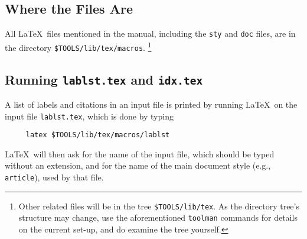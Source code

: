 %

\subsection{Where the Files Are}

%

All \LaTeX\ files mentioned in the manual, including the {\tt sty} and
{\tt doc} files, are in the directory \mbox{\tt \$TOOLS/lib/tex/macros}.%
\footnote{
Other related files will be in the tree \mbox{\tt \$TOOLS/lib/tex}.
As the directory tree's structure may change, use the aforementioned
{\tt toolman} commands for details on the current set-up, and do
examine the tree yourself.
}

\subsection{Running {\tt lablst.tex} and {\tt idx.tex}}

A list of labels and citations in an input file is printed
by running \LaTeX\ on the input file \mbox{\tt lablst.tex},
which is done by typing
\begin{verbatim}
     latex $TOOLS/lib/tex/macros/lablst
\end{verbatim}
\LaTeX\ will then ask for the name of the input file, which should be
typed without an extension, and for the name of the main document style
(e.g., \mbox{\tt article}), used by that file.


